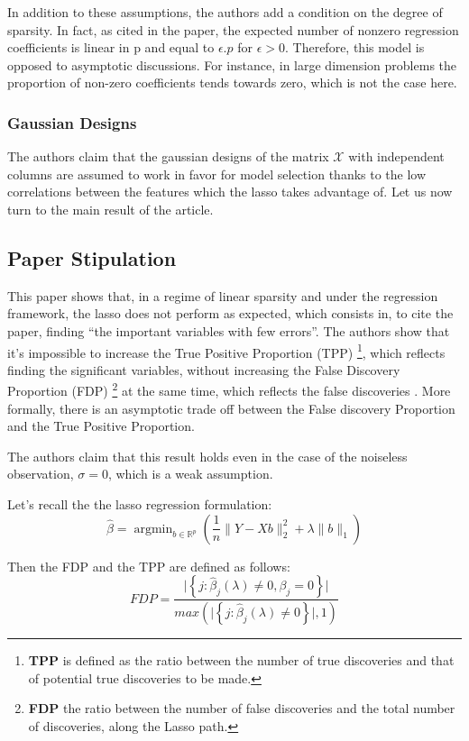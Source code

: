\documentclass[10pt,onecolumn,letterpaper]{article}
\DeclareMathOperator*{\argmin}{argmin}
\begin{document}
In addition to these assumptions, the authors add a condition on the degree of sparsity. In fact, as cited in the paper, the expected number of nonzero regression coefficients is linear in p and equal to $\epsilon.p$ for $\epsilon > 0$. Therefore, this model is opposed to asymptotic discussions. For instance, in large dimension problems the proportion of non-zero coefficients tends towards zero, which is not the case here.

\subsubsection{Gaussian Designs}

The authors claim that the gaussian designs of the matrix $\mathcal{X}$ with independent columns are assumed to work in favor for model selection thanks to the low correlations between the features which the lasso takes advantage of. Let us now turn to the main result of the article.


\subsection{Paper Stipulation }

This paper shows that, in a regime of linear sparsity and under the regression framework, the lasso does not perform as expected, which consists in, to cite the paper, finding “the important variables with few errors”. The authors show that it’s impossible to increase the True Positive Proportion (TPP)  \footnote{\label{tpp}\textbf{TPP} is defined as the ratio between the number of true discoveries and that of potential true discoveries to be made.},  which reflects finding the significant variables, without increasing the False Discovery Proportion (FDP) \footnote{\label{fdp}
\textbf{FDP} the ratio between the number of false discoveries and the total number of discoveries, along the Lasso path.} at the same time, which reflects the false discoveries . More formally, there is an asymptotic trade off between the False discovery Proportion and the True Positive Proportion.


The authors claim that this result holds even in the case of the noiseless observation, $\sigma = 0$, which is a weak assumption.


Let's recall the the lasso regression formulation:
$$
\hat{\beta} = \argmin_{b \in \mathbb{R}^p} \left( \frac{1}{n}\lVert Y - Xb \rVert_2^2 + \lambda \lVert b \rVert_1 \right )
$$

Then the FDP and the TPP are defined as follows:
$$
FDP = \frac{\vert \left\{ j: \hat{\beta}_j(\lambda) \neq 0, \beta_j = 0 \right\} \vert}{ max \left( \vert \left\{ j: \hat{\beta}_j(\lambda) \neq 0 \right\} \vert, 1 \right) }
$$
\end{document}
